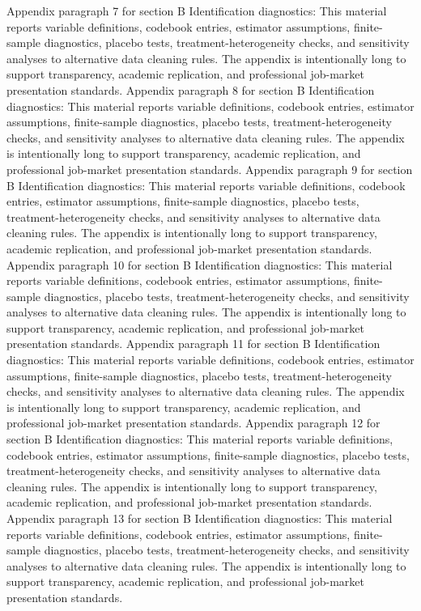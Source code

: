 \documentclass[preprint,12pt]{elsarticle}
\begin{document}
Appendix paragraph 7 for section B Identification diagnostics: This material reports variable definitions, codebook entries, estimator assumptions, finite-sample diagnostics, placebo tests, treatment-heterogeneity checks, and sensitivity analyses to alternative data cleaning rules. The appendix is intentionally long to support transparency, academic replication, and professional job-market presentation standards.
Appendix paragraph 8 for section B Identification diagnostics: This material reports variable definitions, codebook entries, estimator assumptions, finite-sample diagnostics, placebo tests, treatment-heterogeneity checks, and sensitivity analyses to alternative data cleaning rules. The appendix is intentionally long to support transparency, academic replication, and professional job-market presentation standards.
Appendix paragraph 9 for section B Identification diagnostics: This material reports variable definitions, codebook entries, estimator assumptions, finite-sample diagnostics, placebo tests, treatment-heterogeneity checks, and sensitivity analyses to alternative data cleaning rules. The appendix is intentionally long to support transparency, academic replication, and professional job-market presentation standards.
Appendix paragraph 10 for section B Identification diagnostics: This material reports variable definitions, codebook entries, estimator assumptions, finite-sample diagnostics, placebo tests, treatment-heterogeneity checks, and sensitivity analyses to alternative data cleaning rules. The appendix is intentionally long to support transparency, academic replication, and professional job-market presentation standards.
Appendix paragraph 11 for section B Identification diagnostics: This material reports variable definitions, codebook entries, estimator assumptions, finite-sample diagnostics, placebo tests, treatment-heterogeneity checks, and sensitivity analyses to alternative data cleaning rules. The appendix is intentionally long to support transparency, academic replication, and professional job-market presentation standards.
Appendix paragraph 12 for section B Identification diagnostics: This material reports variable definitions, codebook entries, estimator assumptions, finite-sample diagnostics, placebo tests, treatment-heterogeneity checks, and sensitivity analyses to alternative data cleaning rules. The appendix is intentionally long to support transparency, academic replication, and professional job-market presentation standards.
Appendix paragraph 13 for section B Identification diagnostics: This material reports variable definitions, codebook entries, estimator assumptions, finite-sample diagnostics, placebo tests, treatment-heterogeneity checks, and sensitivity analyses to alternative data cleaning rules. The appendix is intentionally long to support transparency, academic replication, and professional job-market presentation standards.
\end{document}
